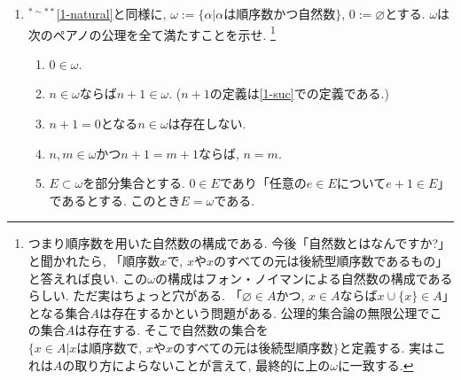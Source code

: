 \documentclass[dvipdfmx,a4paper,11pt]{article}
\theoremstyle{definition}
\begin{document}
\begin{enumerate}[label=\textbf{問}\ref*{sec-1}.\arabic*]
\item $^{* \sim **}$\ref{1-natural}と同様に, $\omega:= \{ \alpha | \text{$\alpha$は順序数かつ自然数}\}$, $0:=\varnothing$とする. 
$\omega$は次のペアノの公理を全て満たすことを示せ. \footnote{つまり順序数を用いた自然数の構成である. 今後「自然数とはなんですか?」と聞かれたら, 「順序数$x$で, $x$や$x$のすべての元は後続型順序数であるもの」と答えれば良い. この$\omega$の構成はフォン・ノイマンによる自然数の構成であるらしい. ただ実はちょっと穴がある. 「$\varnothing \in A$かつ, $x \in A$ならば$x \cup \{ x\} \in A$」となる集合$A$は存在するかという問題がある. 公理的集合論の無限公理でこの集合$A$は存在する. そこで自然数の集合を$\{ x \in A | \text{$x$は順序数で, $x$や$x$のすべての元は後続型順序数}\}$と定義する. 実はこれは$A$の取り方によらないことが言えて, 最終的に上の$\omega$に一致する.  }
   \begin{enumerate}[label=(\arabic*).]
 \setlength{\parskip}{0cm}
  \setlength{\itemsep}{0pt}
  \item $0 \in \omega$.
  \item $n \in \omega$ならば$n+1 \in \omega$. ($n+1$の定義は\ref{1-suc}での定義である.)
  \item $n+1 = 0$となる$n \in \omega$は存在しない.
  \item  $n, m\in \omega$かつ$n+1 = m+1$ならば, $n=m$.
  \item $E \subset \omega$を部分集合とする. $0 \in E$であり「任意の$e \in E$について$e+1 \in E$」であるとする. このとき$E = \omega$である. 
  \end{enumerate}
   \end{enumerate}
\end{document}
